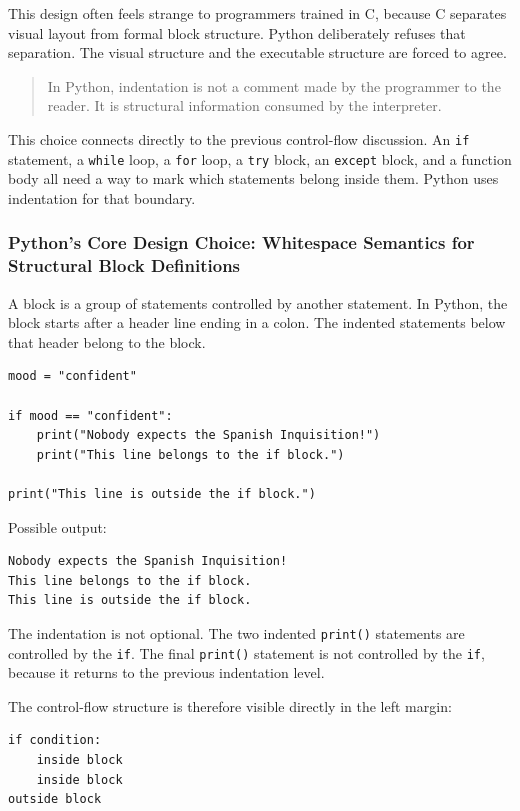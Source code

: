 \documentclass[a4paper,twoside]{report}
\begin{document}
This design often feels strange to programmers trained in C, because C separates visual layout from formal block structure. Python deliberately refuses that separation. The visual structure and the executable structure are forced to agree.

\begin{quote}
In Python, indentation is not a comment made by the programmer to the reader. It is structural information consumed by the interpreter.
\end{quote}

This choice connects directly to the previous control-flow discussion. An \texttt{if} statement, a \texttt{while} loop, a \texttt{for} loop, a \texttt{try} block, an \texttt{except} block, and a function body all need a way to mark which statements belong inside them. Python uses indentation for that boundary.

\subsubsection{Python’s Core Design Choice: Whitespace Semantics for Structural Block Definitions}

A block is a group of statements controlled by another statement. In Python, the block starts after a header line ending in a colon. The indented statements below that header belong to the block.

\begin{verbatim}
mood = "confident"

if mood == "confident":
    print("Nobody expects the Spanish Inquisition!")
    print("This line belongs to the if block.")

print("This line is outside the if block.")
\end{verbatim}

Possible output:

\begin{verbatim}
Nobody expects the Spanish Inquisition!
This line belongs to the if block.
This line is outside the if block.
\end{verbatim}

The indentation is not optional. The two indented \texttt{print()} statements are controlled by the \texttt{if}. The final \texttt{print()} statement is not controlled by the \texttt{if}, because it returns to the previous indentation level.

The control-flow structure is therefore visible directly in the left margin:

\begin{verbatim}
if condition:
    inside block
    inside block
outside block
\end{verbatim}
\end{document}
